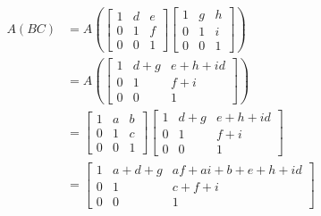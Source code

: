 \documentclass[12pt,letterpaper]{article}
\begin{document}
\begin{enumerate}
\begin{enumerate}
          \begin{align*}
            A(BC) &= A
              \left(
                \begin{bmatrix}
                  1 & d & e \\
                  0 & 1 & f \\
                  0 & 0 & 1
                \end{bmatrix}
                \begin{bmatrix}
                  1 & g & h \\
                  0 & 1 & i \\
                  0 & 0 & 1
                \end{bmatrix}
              \right) \\
            &= A
              \left(
                \begin{bmatrix}
                  1 & d+g & e+h+id \\
                  0 & 1   & f+i \\
                  0 & 0   & 1
                \end{bmatrix}
              \right) \\
            &=
              \begin{bmatrix}
                1 & a & b \\
                0 & 1 & c \\
                0 & 0 & 1
              \end{bmatrix}
              \begin{bmatrix}
                1 & d+g & e+h+id \\
                0 & 1   & f+i \\
                0 & 0   & 1
              \end{bmatrix} \\
            &=
              \begin{bmatrix}
                1 & a+d+g & af+ai+b+e+h+id \\
                0 & 1     & c+f+i \\
                0 & 0     & 1
              \end{bmatrix}
          \end{align*}


\end{enumerate}
\end{enumerate}
\end{document}

